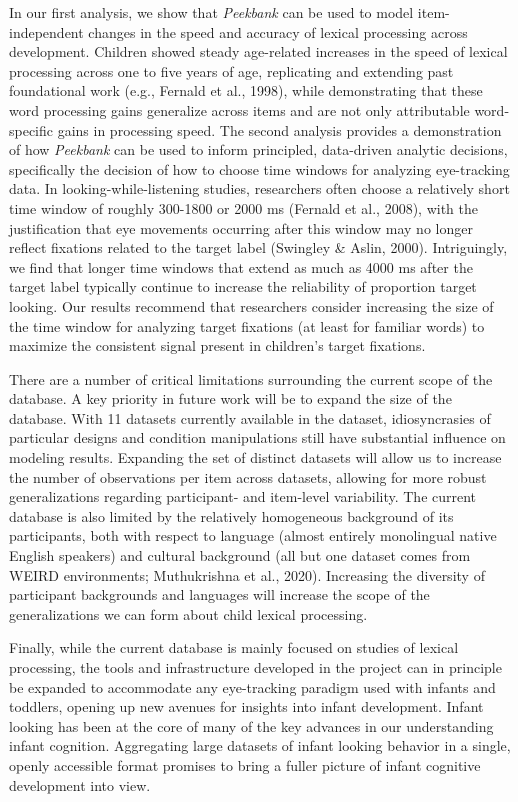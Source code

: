 \documentclass[10pt, letterpaper]{article}
\begin{document}
In our first analysis, we show that \emph{Peekbank} can be used to model
item-independent changes in the speed and accuracy of lexical processing
across development. Children showed steady age-related increases in the
speed of lexical processing across one to five years of age, replicating
and extending past foundational work (e.g., Fernald et al., 1998), while
demonstrating that these word processing gains generalize across items
and are not only attributable word-specific gains in processing speed.
The second analysis provides a demonstration of how \emph{Peekbank} can
be used to inform principled, data-driven analytic decisions,
specifically the decision of how to choose time windows for analyzing
eye-tracking data. In looking-while-listening studies, researchers often
choose a relatively short time window of roughly 300-1800 or 2000 ms
(Fernald et al., 2008), with the justification that eye movements
occurring after this window may no longer reflect fixations related to
the target label (Swingley \& Aslin, 2000). Intriguingly, we find that
longer time windows that extend as much as 4000 ms after the target
label typically continue to increase the reliability of proportion
target looking. Our results recommend that researchers consider
increasing the size of the time window for analyzing target fixations
(at least for familiar words) to maximize the consistent signal present
in children's target fixations.

There are a number of critical limitations surrounding the current scope
of the database. A key priority in future work will be to expand the
size of the database. With 11 datasets currently available in the
dataset, idiosyncrasies of particular designs and condition
manipulations still have substantial influence on modeling results.
Expanding the set of distinct datasets will allow us to increase the
number of observations per item across datasets, allowing for more
robust generalizations regarding participant- and item-level
variability. The current database is also limited by the relatively
homogeneous background of its participants, both with respect to
language (almost entirely monolingual native English speakers) and
cultural background (all but one dataset comes from WEIRD environments;
Muthukrishna et al., 2020). Increasing the diversity of participant
backgrounds and languages will increase the scope of the generalizations
we can form about child lexical processing.

Finally, while the current database is mainly focused on studies of
lexical processing, the tools and infrastructure developed in the
project can in principle be expanded to accommodate any eye-tracking
paradigm used with infants and toddlers, opening up new avenues for
insights into infant development. Infant looking has been at the core of
many of the key advances in our understanding infant cognition.
Aggregating large datasets of infant looking behavior in a single,
openly accessible format promises to bring a fuller picture of infant
cognitive development into view.
\end{document}
